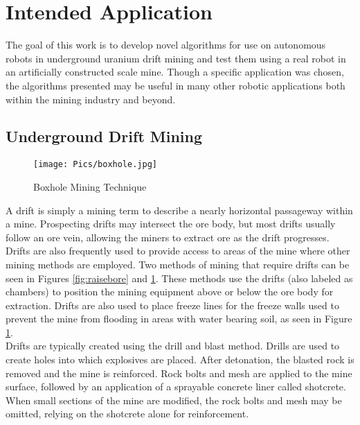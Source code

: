 \section{Intended Application}
\label{sec:prob}
The goal of this work is to develop novel algorithms for use on autonomous robots in underground uranium drift mining and test them using a real robot in an artificially constructed scale mine. Though a specific application was chosen, the algorithms presented may be useful in many other robotic applications both within the mining industry and beyond.\\
\subsection{Underground Drift Mining}

\begin{figure}
    \centering
    \texttt{[image: Pics/boxhole.jpg]}
    \caption{Boxhole Mining Technique \cite{weblink}}
    \label{fig:boxhole}
\end{figure}
A drift is simply a mining term to describe a nearly horizontal passageway within a mine. Prospecting drifts may intersect the ore body, but most drifts usually follow an ore vein, allowing the miners to extract ore as the drift progresses. Drifts are also frequently used to provide access to areas of the mine where other mining methods are employed. Two methods of mining that require drifts can be seen in Figures \ref{fig:raisebore} and \ref{fig:boxhole}. These methods use the drifts (also labeled as chambers) to position the mining equipment above or below the ore body for extraction. Drifts are also used to place freeze lines for the freeze walls used to prevent the mine from flooding in areas with water bearing soil, as seen in Figure \ref{fig:boxhole}.\\

Drifts are typically created using the drill and blast method. Drills are used to create holes into which explosives are placed. After detonation, the blasted rock is removed and the mine is reinforced. Rock bolts and mesh are applied to the mine surface, followed by an application of a sprayable concrete liner called shotcrete. When small sections of the mine are modified, the rock bolts and mesh may be omitted, relying on the shotcrete alone for reinforcement.\\

